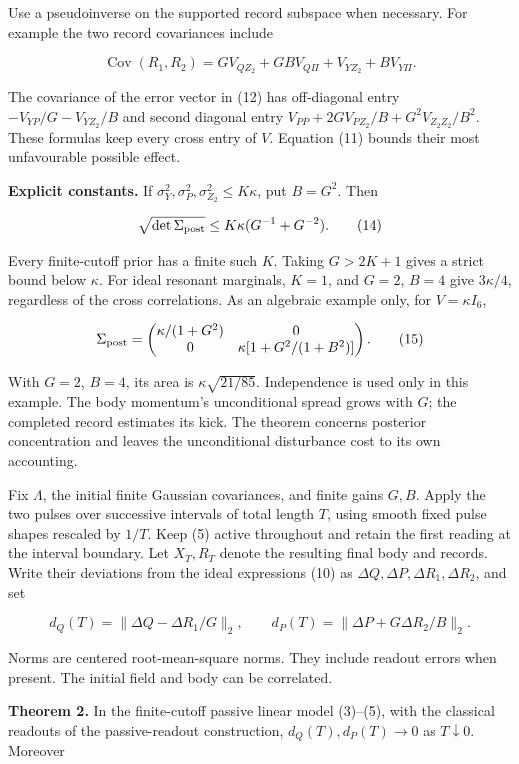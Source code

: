 \documentclass[11pt,a4paper]{article}
\begin{document}
Use a pseudoinverse on the supported record subspace when necessary. For
example the two record covariances include

\[\operatorname{Cov}(R_1,R_2)
 =G V_{QZ_2}+GB V_{Q\Pi}+V_{YZ_2}+B V_{Y\Pi}.\]

The covariance of the error vector in (12) has off-diagonal entry
\(-V_{YP}/G-V_{YZ_2}/B\) and second diagonal entry
\(V_{PP}+2G V_{PZ_2}/B+G^2V_{Z_2Z_2}/B^2\). These formulas keep every
cross entry of \(V\). Equation (11) bounds their most unfavourable
possible effect.

\textbf{Explicit constants.} If
\(\sigma_Y^2,\sigma_P^2, \sigma_{Z_2}^2\le K\kappa\), put \(B=G^2\).
Then

\[\sqrt{\det\Sigma_{\rm post}}
 \le K\kappa(G^{-1}+G^{-2}). \tag{14}\]

Every finite-cutoff prior has a finite such \(K\). Taking \(G>2K+1\)
gives a strict bound below \(\kappa\). For ideal resonant marginals,
\(K=1\), and \(G=2\), \(B=4\) give \(3\kappa/4\), regardless of the
cross correlations. As an algebraic example only, for \(V=\kappa I_6\),

\[\Sigma_{\rm post}=
\begin{pmatrix}
\kappa/(1+G^2)&0\\
0&\kappa[1+G^2/(1+B^2)]
\end{pmatrix}. \tag{15}\]

With \(G=2\), \(B=4\), its area is \(\kappa\sqrt{21/85}\). Independence
is used only in this example. The body momentum's unconditional spread
grows with \(G\); the completed record estimates its kick. The theorem
concerns posterior concentration and leaves the unconditional
disturbance cost to its own accounting.

Fix \(\Lambda\), the initial finite Gaussian covariances, and finite
gains \(G,B\). Apply the two pulses over successive intervals of total
length \(T\), using smooth fixed pulse shapes rescaled by \(1/T\). Keep
(5) active throughout and retain the first reading at the interval
boundary. Let \(X_T,R_T\) denote the resulting final body and records.
Write their deviations from the ideal expressions (10) as
\(\Delta Q,\Delta P, \Delta R_1,\Delta R_2\), and set

\[d_Q(T)=\|\Delta Q-\Delta R_1/G\|_2,\qquad
d_P(T)=\|\Delta P+G\Delta R_2/B\|_2. \tag{16}\]

Norms are centered root-mean-square norms. They include readout errors
when present. The initial field and body can be correlated.

\textbf{Theorem 2.} In the finite-cutoff passive linear model (3)--(5),
with the classical readouts of the passive-readout construction,
\(d_Q(T),d_P(T)\to0\) as \(T\downarrow0\). Moreover
\end{document}
